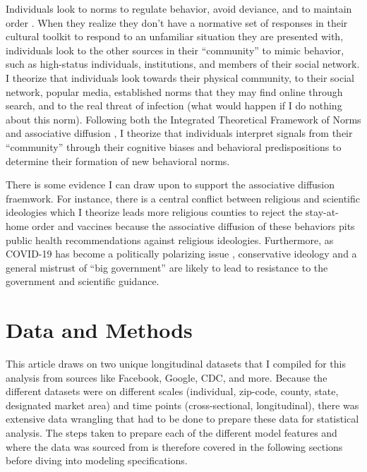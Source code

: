 Individuals look to norms to regulate behavior, avoid
deviance, and to maintain order \citep{horneNormsIntegratedFramework2020, shepherdStructurePerceptionHow2017}. When they realize they don't have a normative
set of responses in their cultural toolkit to respond to an unfamiliar situation
they are presented with, individuals look to the other sources in their
``community'' to mimic behavior, such as high-status individuals, institutions,
and members of their social network. I theorize that individuals look towards
their physical community, to their social network, popular media, established
norms that they may find online through search, and to the real threat of 
infection (what would happen if I do nothing about this norm). 
Following both the Integrated Theoretical Framework of Norms 
\citep{horneNormsIntegratedFramework2020} and
associative diffusion \citep{dellapostaWhyLiberalsDrink2015, goldbergSocialContagionAssociative2018},
I theorize that individuals interpret
signals from their ``community'' through their cognitive biases and behavioral
predispositions to determine their formation of new behavioral norms.

There is some evidence I can draw upon to support the associative diffusion
fraemwork. For instance, there is a central conflict between religious and
scientific ideologies which I theorize leads more religious counties to reject
the stay-at-home order and vaccines \citep{evansReligionScienceEpistemological2008}
because the associative diffusion of these behaviors pits public health
recommendations against religious ideologies.
Furthermore, as COVID-19 has become a politically polarizing issue \citep{ternullo22},
conservative ideology and a general mistrust of ``big government'' \citep{frank2007, gauchat2008} 
are likely to lead to resistance to the government and scientific guidance.

\hypertarget{data-and-methods}{%
\section{Data and Methods}\label{data-and-methods}}

This article draws on two unique longitudinal datasets that I compiled for this
analysis from sources like Facebook, Google, CDC, and more. Because the
different datasets were on different scales (individual, zip-code, county,
state, designated market area) and time points (cross-sectional, longitudinal),
there was extensive data wrangling that had to be done to prepare these data for
statistical analysis. The steps taken to prepare each of the different model
features and where the data was sourced from is therefore covered in the
following sections before diving into modeling specifications.

